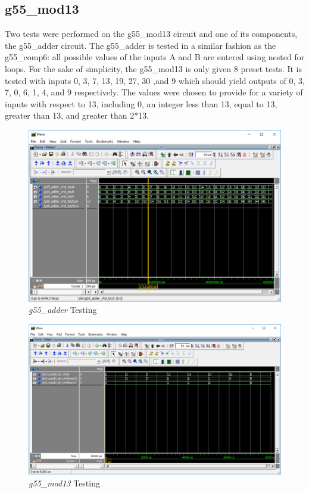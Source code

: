 \documentclass[12pt]{article}
\begin{document}
\subsection{g55\_mod13}
Two tests were performed on the g55\_mod13 circuit and one of its components, the g55\_adder circuit. The g55\_adder is tested in a similar fashion as the g55\_comp6: all possible values of the inputs A and B are entered using nested for loops. For the sake of simplicity, the g55\_mod13 is only given 8 preset tests. It is tested with inputs 0, 3, 7, 13, 19, 27, 30 ,and 9 which should yield outputs of 0, 3, 7, 0, 6, 1, 4, and 9 respectively. The values were chosen to provide for a variety of inputs with respect to 13, including 0, an integer less than 13, equal to 13, greater than 13, and greater than 2*13.

\begin{figure}[h!t]
\centering
\includegraphics[scale=0.3]{graphics/adder_wave.png}
\caption{\textit{g55\_adder} Testing}
\end{figure}
\begin{figure}[h!b]
\centering
\includegraphics[scale=0.3]{graphics/mod13_wave.png}
\caption{\textit{g55\_mod13} Testing}
\end{figure}
\end{document}

